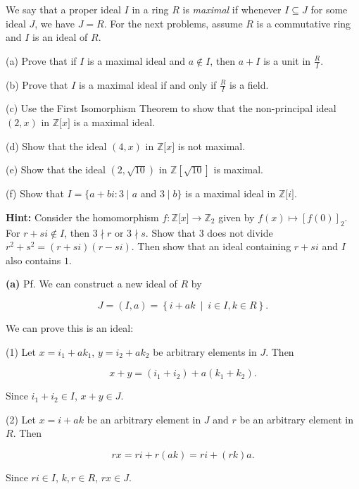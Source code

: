 We say that a proper ideal \(I\) in a ring \(R\) is \emph{maximal} if whenever \(I \subseteq J\) for some ideal \(J\), we have \(J = R\). For the next problems, assume \(R\) is a commutative ring and \(I\) is an ideal of \(R\).

(a) Prove that if \(I\) is a maximal ideal and \(a \notin I\), then \(a + I\) is a unit in \(\frac{R}{I}\).

(b) Prove that \(I\) is a maximal ideal if and only if \(\frac{R}{I}\) is a field.

(c) Use the First Isomorphism Theorem to show that the non-principal ideal \(\left( {2,x} \right)\) in \(\mathbb{Z}\lbrack x\rbrack\) is a maximal ideal.

(d) Show that the ideal \(\left( {4,x} \right)\) in \(\mathbb{Z}\lbrack x\rbrack\) is not maximal.

(e) Show that the ideal \(\left( {2,\sqrt{10}} \right)\) in \(\mathbb{Z}\left\lbrack \sqrt{10} \right\rbrack\) is maximal.

(f) Show that \(I = \{ a + bi:3 \mid a\) and \(3 \mid b\}\) is a maximal ideal in \(\mathbb{Z}\lbrack i\rbrack\).

\textbf{Hint:} Consider the homomorphism \(f:\mathbb{Z}\lbrack x\rbrack\rightarrow\mathbb{Z}_{2}\) given by \(f(x)\mapsto\left\lbrack {f(0)} \right\rbrack_{2}\). For \(r + si \notin I\), then \(3 \nmid r\) or \(3 \nmid s\). Show that \(3\) does not divide \(r^{2} + s^{2} = \left( {r + si} \right)\left( {r - si} \right)\). Then show that an ideal containing \(r + si\) and \(I\) also contains \(1\).

\textbf{(a)} Pf. We can construct a new ideal of \(R\) by

\[J = \left( {I,a} \right) = \left\{ i + ak\  \middle| \ i \in I,k \in R \right\}.\]

We can prove this is an ideal:

(1) Let \(x = i_{1} + ak_{1}\), \(y = i_{2} + ak_{2}\) be arbitrary elements in \(J\). Then

\[x + y = \left( {i_{1} + i_{2}} \right) + a\left( {k_{1} + k_{2}} \right).\]

Since \(i_{1} + i_{2} \in I\), \(x + y \in J\).

(2) Let \(x = i + ak\) be an arbitrary element in \(J\) and \(r\) be an arbitrary element in \(R\). Then

\[rx = ri + r\left( {ak} \right) = ri + \left( {rk} \right)a.\]

Since \(ri \in I\), \(k,r \in R\), \(rx \in J\).


